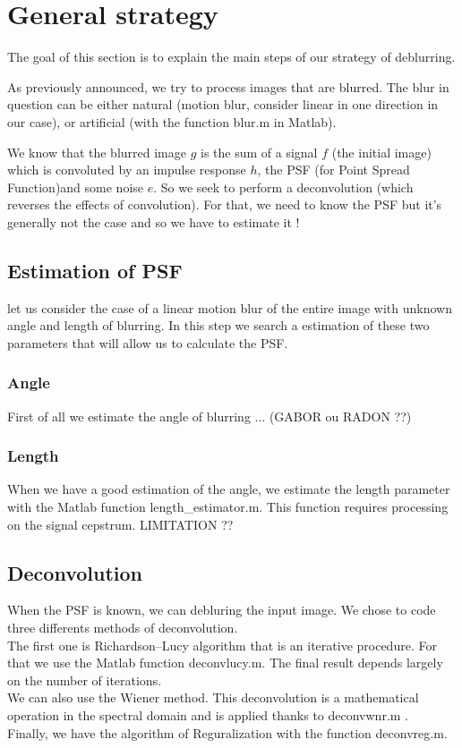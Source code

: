

\chapter{General strategy}

The goal of this section is to explain the main steps of our strategy of deblurring.

As previously announced, we try to process images that are blurred. The blur in question can be either natural (motion blur, consider linear in one direction in our case), or artificial (with the function blur.m in Matlab).

We know that the blurred image $g$ is the sum of a signal $f$ (the initial image) which is convoluted by an impulse response $h$, the PSF (for Point Spread Function)and some noise $e$. So we seek to perform a deconvolution (which reverses the effects of convolution). For that, we need to know the PSF but it's generally not the case and so we have to estimate it ! 
  
\section{Estimation of PSF}

let us consider the case of a linear motion blur of the entire image with unknown angle and length of blurring. In this step we search a estimation of these two parameters that will allow us to calculate the PSF. 
\subsection{Angle}
First of all we estimate the angle of blurring ... (GABOR ou RADON ??)

\subsection{Length}
When we have a good estimation of the angle, we estimate the length parameter with the Matlab function length_estimator.m. This function requires processing on the signal cepstrum. 
LIMITATION ??

\section{Deconvolution}

When the PSF is known, we can debluring the input image. We chose to code three differents methods of deconvolution.
\\
The first one is Richardson–Lucy algorithm that is an iterative procedure. For that we use the Matlab function deconvlucy.m. The final result depends largely on the number of iterations.
\\ 
We can also use the Wiener method. This deconvolution is a mathematical operation in the spectral domain and is applied thanks to deconvwnr.m .
\\
Finally, we have the algorithm of Reguralization with the function deconvreg.m.

